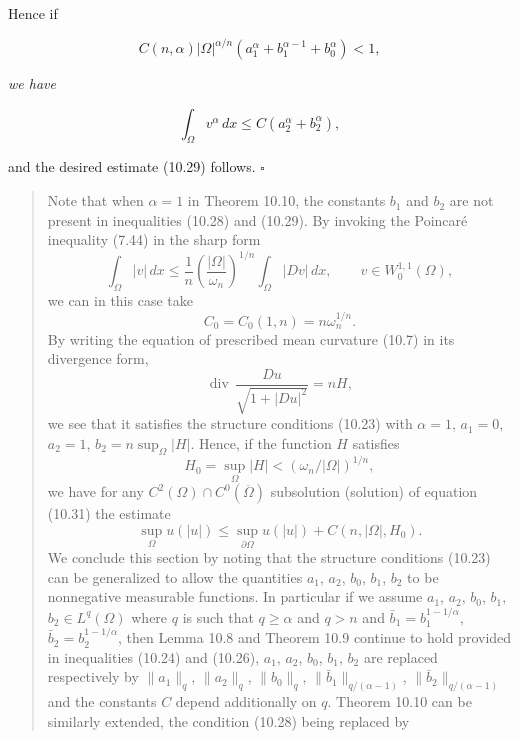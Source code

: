 Hence if

\[
C(n,\alpha)|\Omega|^{\alpha/n}(a_1^{\alpha} + b_1^{\alpha-1} + b_0^{\alpha}) < 1,
\]

\textit{we have}

\[
\int_{\Omega} v^{\alpha}\,dx \leq C(a_2^{\alpha}+b_2^{\alpha}),
\]

and the desired estimate (10.29) follows. $\square$



\begin{quote}
Note that when $\alpha = 1$ in Theorem 10.10, the constants $b_1$ and $b_2$ are not present in inequalities (10.28) and (10.29). By invoking the Poincar\'e inequality (7.44) in the sharp form
\begin{equation}
\tag{10.30}
\int_{\Omega} |v|\,dx \le \frac{1}{n} \left(\frac{|\Omega|}{\omega_n}\right)^{1/n} \int_{\Omega} |Dv|\,dx, \qquad v \in W^{1,1}_0(\Omega),
\end{equation}
we can in this case take
\[
C_0 = C_0(1,n) = n\omega_n^{1/n}.
\]
By writing the equation of prescribed mean curvature (10.7) in its divergence form,
\begin{equation}
\tag{10.31}
\operatorname{div}\,\frac{Du}{\sqrt{1+|Du|^2}} = nH,
\end{equation}
we see that it satisfies the structure conditions (10.23) with $\alpha = 1$, $a_1 = 0$, $a_2 = 1$, $b_2 = n\sup_{\Omega}|H|$. Hence, if the function $H$ satisfies
\begin{equation}
\tag{10.32}
H_0 = \sup_{\Omega}|H| < (\omega_n/|\Omega|)^{1/n},
\end{equation}
we have for any $C^2(\Omega) \cap C^0(\overline{\Omega})$ subsolution (solution) of equation (10.31) the estimate
\begin{equation}
\tag{10.33}
\sup_{\Omega} u(|u|) \le \sup_{\partial\Omega} u(|u|) + C(n,|\Omega|,H_0).
\end{equation}
We conclude this section by noting that the structure conditions (10.23) can be generalized to allow the quantities $a_1$, $a_2$, $b_0$, $b_1$, $b_2$ to be nonnegative measurable functions. In particular if we assume $a_1$, $a_2$, $b_0$, $b_1$, $b_2 \in L^q(\Omega)$ where $q$ is such that $q \ge \alpha$ and $q > n$ and $\bar b_1 = b_1^{1-1/\alpha}$, $\bar b_2 = b_2^{1-1/\alpha}$, then Lemma 10.8 and Theorem 10.9 continue to hold provided in inequalities (10.24) and (10.26), $a_1$, $a_2$, $b_0$, $b_1$, $b_2$ are replaced respectively by $\|a_1\|_q$, $\|a_2\|_q$, $\|b_0\|_q$, $\|\bar b_1\|_{q/(\alpha-1)}$, $\|\bar b_2\|_{q/(\alpha-1)}$ and the constants $C$ depend additionally on $q$. Theorem 10.10 can be similarly extended, the condition (10.28) being replaced by

\end{quote}
